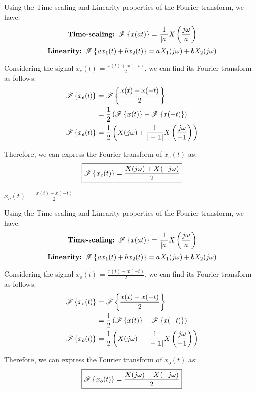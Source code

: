 \documentclass[a4paper, 10pt]{article}
\begin{document}
\begin{solution}
Using the Time-scaling and Linearity properties of the Fourier transform, we have:
\[
    \textbf{Time-scaling: } \mathscr{F} \left\{ x(at) \right\} = \frac{1}{|a|} X\left( \frac{j\omega}{a} \right)
\]
\[
    \textbf{Linearity: } \mathscr{F} \left\{ ax_1(t) + bx_2(t) \right\} = aX_1(j\omega) + bX_2(j\omega)
\]

Considering the signal \( x_e(t) = \frac{x(t) + x(-t)}{2} \), we can find its Fourier transform as follows:
\begin{align*}  
    \mathscr{F} \left\{ x_e(t) \right\} &= \mathscr{F} \left\{ \frac{x(t) + x(-t)}{2} \right\} \\
    &= \frac{1}{2} \left( \mathscr{F} \left\{ x(t) \right\} + \mathscr{F} \left\{ x(-t) \right\} \right) \\
    \mathscr{F} \left\{ x_e(t) \right\} &= \frac{1}{2} \left( X(j\omega) + \frac{1}{|-1|} X\left( \frac{j\omega}{-1} \right) \right)
\end{align*}

Therefore, we can express the Fourier transform of \( x_e(t) \) as:
\[ \boxed{
    \mathscr{F} \left\{ x_e(t) \right\} = \frac{X(j\omega) + X(-j\omega)}{2}
} \]
\end{solution}

\newpage

\begin{subproblems}[resume]
    \item \( x_o(t) = \frac{x(t) - x(-t)}{2} \)
\end{subproblems}

\begin{solution}
Using the Time-scaling and Linearity properties of the Fourier transform, we have:
\[
    \textbf{Time-scaling: } \mathscr{F} \left\{ x(at) \right\} = \frac{1}{|a|} X\left( \frac{j\omega}{a} \right)
\]
\[
    \textbf{Linearity: } \mathscr{F} \left\{ ax_1(t) + bx_2(t) \right\} = aX_1(j\omega) + bX_2(j\omega)
\]

Considering the signal \( x_o(t) = \frac{x(t) - x(-t)}{2} \), we can find its Fourier transform as follows:
\begin{align*}  
    \mathscr{F} \left\{ x_o(t) \right\} &= \mathscr{F} \left\{ \frac{x(t) - x(-t)}{2} \right\} \\
    &= \frac{1}{2} \left( \mathscr{F} \left\{ x(t) \right\} - \mathscr{F} \left\{ x(-t) \right\} \right) \\
    \mathscr{F} \left\{ x_o(t) \right\} &= \frac{1}{2} \left( X(j\omega) - \frac{1}{|-1|} X\left( \frac{j\omega}{-1} \right) \right)
\end{align*}

Therefore, we can express the Fourier transform of \( x_o(t) \) as:
\[ \boxed{
    \mathscr{F} \left\{ x_o(t) \right\} = \frac{X(j\omega) - X(-j\omega)}{2}
} \]
\end{solution}
\end{document}
